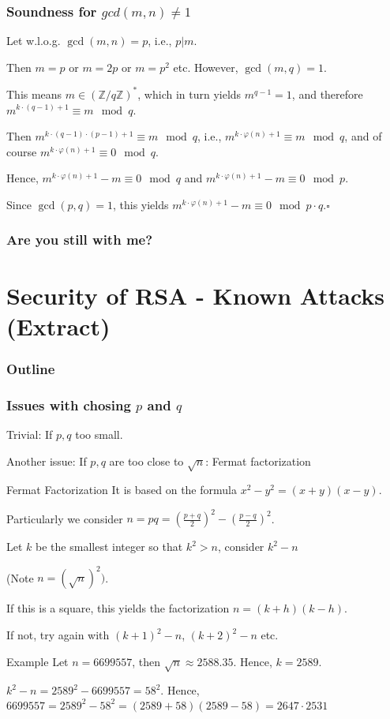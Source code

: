 \documentclass{beamer}
\begin{document}
\begin{frame}
\frametitle{Soundness for $gcd(m,n)\neq 1$}
Let w.l.o.g. $\gcd(m,n)=p$, i.e., $p|m$. \pause

Then $m=p$ or $m=2p$ or $m=p^2$ etc. However, $\gcd(m,q)=1$.\pause

This means $m\in\left(\mathbb{Z}/q\mathbb{Z}\right)^*$, which in turn yields $m^{q-1}=1$, and therefore $m^{k\cdot(q-1)+1}\equiv m\mod q$.\pause

Then $m^{k\cdot (q-1)\cdot (p-1)+1}\equiv m \mod q$, i.e., $m^{k\cdot\varphi(n)+1}\equiv m\mod q$, and of course $m^{k\cdot\varphi(n)+1}\equiv 0\mod q$.\pause

Hence, $m^{k\cdot\varphi(n)+1}-m\equiv 0\mod q$ and $m^{k\cdot\varphi(n)+1}-m\equiv 0\mod p$. \pause

Since $\gcd(p,q)=1$, this yields $m^{k\cdot\varphi(n)+1}-m\equiv 0\mod p\cdot q$.\flushright$\square$
\end{frame}

\begin{frame}
\frametitle{Are you still with me?}
\begin{figure}
\end{figure}


\end{frame}

\section{Security of RSA - Known Attacks (Extract)}
\begin{frame}
\frametitle{Outline}
\tableofcontents
\end{frame}
\begin{frame}
\frametitle{Issues with chosing $p$ and $q$}
Trivial: If $p,q$ too small.\pause

Another issue: If $p,q$ are too close to $\sqrt{n}$: Fermat factorization

\begin{block}{Fermat Factorization}
It is based on the formula $x^2-y^2=(x+y)(x-y)$.

Particularly we consider $n=pq=\left(\frac{p+q}{2}\right)^2-\left(\frac{p-q}{2}\right)^2$.\pause

Let $k$ be the smallest integer so that $k^2>n$, consider $k^2-n$ 

(Note $n=(\sqrt{n})^2)$.\pause

 If this is a square, this yields the factorization $n=(k+h)(k-h)$.\pause

If not, try again with $(k+1)^2-n$, $(k+2)^2-n$ etc.
\end{block}
\begin{block}{Example}
Let $n=6699557$, then $\sqrt{n}\approx 2588.35$. Hence, $k=2589$.\pause

%
$k^2-n=2589^2-6699557=58^2$. Hence, $6699557=2589^2-58^2=(2589+58)(2589-58)=2647\cdot 2531$
\end{block}




\end{frame}
\end{document}
